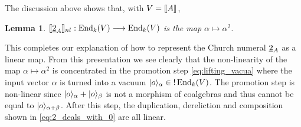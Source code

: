 \documentclass[english,letter paper,12pt,reqno]{article}
\DeclarePairedDelimiter\ket{\lvert}{\rangle}
\newtheorem{lemma}[theorem]{Lemma}
\theoremstyle{example}
\numberwithin{equation}{section}
\DeclareMathOperator{\End}{End}
\begin{document}
The discussion above shows that, with $V = \llbracket A \rrbracket$,

\begin{lemma}\label{lemma:nonlinear_recover} $\den{\church{2}_A}_{nl}: \End_k(V) \lto \End_k(V)$ is the map $\alpha \mapsto \alpha^2$.
\end{lemma}

This completes our explanation of how to represent the Church numeral $\underline{2}_A$ as a linear map. From this presentation we see clearly that the non-linearity of the map $\alpha \mapsto \alpha^2$ is concentrated in the promotion step \eqref{eq:lifting_vacua} where the input vector $\alpha$ is turned into a vacuum $\ket{o}_\alpha \in {!} \End_k(V)$. The promotion step is non-linear since $\ket{o}_\alpha + \ket{o}_\beta$ is not a morphism of coalgebras and thus cannot be equal to $\ket{o}_{\alpha + \beta}$. After this step, the duplication, dereliction and composition shown in \eqref{eq:2_deals_with_0} are all linear. %

\end{document}
